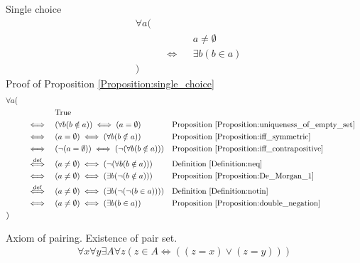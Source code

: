 \begin{prop}
\label{Proposition:single_choice}
Single choice
\begin{align*}
& \forall a ( \\
& \quad && && a \neq \emptyset \\
& \quad && \iff && \exists b (b \in a) \\
& )
\end{align*}
Proof of Proposition \ref{Proposition:single_choice}
\begin{align*}
& \forall a ( \\
& \quad && && \text{True} \\
& \quad && \iff && (\forall b (b \notin a)) \iff (a = \emptyset)
&& \text{Proposition \ref{Proposition:uniqueness_of_empty_set}} \\
& \quad && \iff && (a = \emptyset) \iff (\forall b (b \notin a))
&& \text{Proposition \ref{Proposition:iff_symmetric}} \\
& \quad && \iff && (\lnot (a = \emptyset)) \iff (\lnot (\forall b (b \notin a)))
&& \text{Proposition \ref{Proposition:iff_contrapositive}} \\
& \quad && \overset{\operatorname{def}}{\iff} && (a \neq \emptyset) \iff (\lnot (\forall b (b \notin a)))
&& \text{Definition \ref{Definition:neq}} \\
& \quad && \iff && (a \neq \emptyset) \iff (\exists b (\lnot (b \notin a)))
&& \text{Proposition \ref{Proposition:De_Morgan_1}} \\
& \quad && \overset{\operatorname{def}}{\iff} && (a \neq \emptyset) \iff (\exists b (\lnot (\lnot (b \in a))))
&& \text{Definition \ref{Definition:notin}} \\
& \quad && \iff && (a \neq \emptyset) \iff (\exists b (b \in a))
&& \text{Proposition \ref{Proposition:double_negation}} \\
& )
\end{align*}
\end{prop}

\begin{axm}
\label{Axiom:axiom_of_pairing}
Axiom of pairing. Existence of pair set.
\begin{align*}
\forall x \forall y \exists A \forall z (z \in A \iff ((z=x) \lor (z=y)))
\end{align*}
\end{axm}

